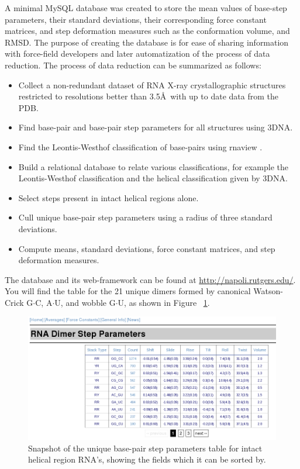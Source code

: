 A minimal MySQL database was created to store the mean values of
base-step   parameters,   their   standard   deviations,   their
corresponding  force constant  matrices, and step deformation measures
such as the conformation volume, and RMSD. The  purpose of  creating the
database is for ease of sharing information with force-field
developers and  later automatization of the process of data reduction.
The process of data reduction can be summarized as follows:
\begin{itemize}
\item{Collect a non-redundant dataset of RNA X-ray crystallographic
  structures restricted to resolutions better than 3.5\AA~with up to
  date data from the PDB.}
\item{Find base-pair and base-pair step parameters for all structures
  using 3DNA.}
\item{Find the Leontis-Westhof classification of base-pairs using
  rnaview \cite{yang2003}.}
\item{Build a relational database to relate various classifications,
  for example the Leontis-Westhof classification and the helical
  classification given by 3DNA.}
\item{Select steps present in intact helical regions alone.}
\item{Cull unique base-pair step parameters using a radius of three
  standard deviations.}
\item{Compute means, standard deviations, force constant matrices, and
step deformation measures.}  
\end{itemize}  

The database and its web-framework can be found at
\url{http://napoli.rutgers.edu/}. You will find the table for the 21
unique dimers formed by canonical Watson-Crick G$\cdot$C, A$\cdot$U,
and wobble G$\cdot$U, as shown in Figure ~\ref{fig:average}.

\begin{figure}[htbp]
\centering
\includegraphics[angle=0, scale=0.4]{Chapter4/average.png}
\caption{Snapshot of the unique base-pair step parameters table for
  intact helical region RNA's, showing the fields which it can be
  sorted by.}
\label{fig:average}
\end{figure}  

